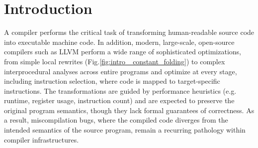 \documentclass[review, anonymous, acmsmall, screen]{acmart}
\begin{document}
\section{Introduction}
A compiler performs the critical task of transforming human-readable source code into executable 
machine code. In addition, modern, large-scale, open-source compilers such as LLVM \cite{llvm_ref} 
perform a wide range of sophisticated optimizations, from simple local rewrites (Fig.\ref{fig:intro_
constant_folding}) to complex interprocedural analyses across entire programs and optimize at every 
stage, including instruction selection, where code is mapped to target-specific instructions. The 
transformations are guided by performance heuristics (e.g. runtime, register usage, instruction count) 
 and are expected to preserve the original program semantics, though they lack formal guarantees of correctness.
As a result, miscompilation bugs, where the compiled code diverges from  the intended semantics of 
the source program, remain a recurring pathology within compiler infrastructures.
\end{document}
